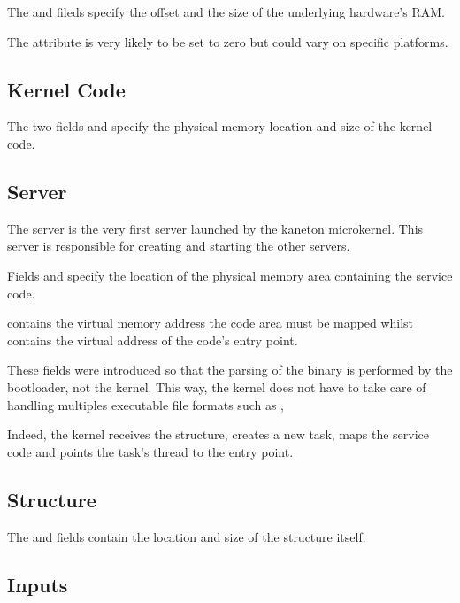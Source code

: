 The  and  fileds specify the offset and the size of
the underlying hardware's RAM.

The  attribute is very likely to be set to zero but could
vary on specific platforms.


\subsection*{Kernel Code}

The two fields  and  specify the physical memory
location and size of the kernel code.


\subsection*{ Server}

The  server is the very first server launched by the kaneton
microkernel. This server is responsible for creating and starting the
other servers.

Fields  and  specify the location of the physical
memory area containing the  service code.

 contains the virtual memory address the code area must
be mapped whilst  contains the virtual address of the code's
entry point.

These fields were introduced so that the parsing of the  binary
is performed by the bootloader, not the kernel. This way, the kernel does not
have to take care of handling multiples executable file formats such as
,  \etc{}

Indeed, the kernel receives the  structure, creates a new task,
maps the  service code and points the task's thread to the
entry point.


\subsection*{ Structure}

The  and  fields contain the location and size
of the  structure itself.


\subsection*{Inputs}

